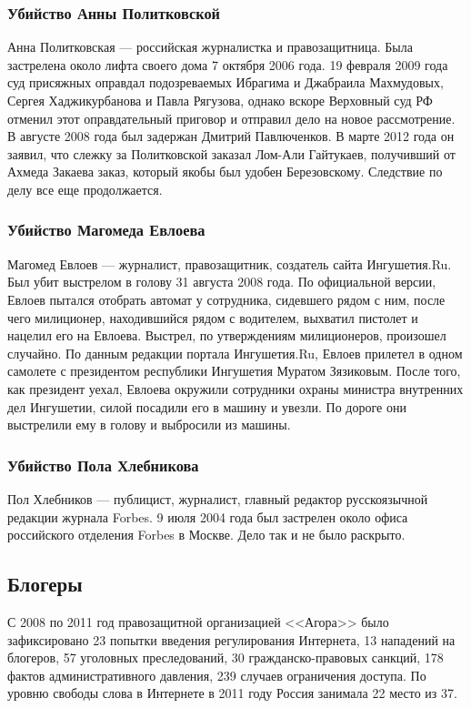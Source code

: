\subsubsection{Убийство Анны Политковской}
Анна Политковская --- российская журналистка и правозащитница. Была застрелена около лифта своего дома 7 октября 2006 года\cite{politkovskaya_death}. 19 февраля 2009 года суд присяжных оправдал подозреваемых Ибрагима и Джабраила Махмудовых, Сергея Хаджикурбанова и Павла Рягузова\cite{politkovskaya_court1}, однако вскоре Верховный суд РФ отменил этот оправдательный приговор и отправил дело на новое рассмотрение\cite{politkovskaya_court2,politkovskaya_court3}. В августе 2008 года был задержан Дмитрий Павлюченков\cite{politkovskaya_pavluchenkov}. В марте 2012 года он заявил, что слежку за Политковской заказал Лом-Али Гайтукаев, получивший от Ахмеда Закаева заказ, который якобы был удобен Березовскому\cite{politkovskaya_head}. Следствие по делу все еще продолжается.
\subsubsection{Убийство Магомеда Евлоева}
Магомед Евлоев --- журналист, правозащитник, создатель сайта Ингушетия.Ru. Был убит выстрелом в голову 31 августа 2008 года. По официальной версии, Евлоев пытался отобрать автомат у сотрудника, сидевшего рядом с ним, после чего милиционер, находившийся рядом с водителем, выхватил пистолет и нацелил его на Евлоева. Выстрел, по утверждениям милиционеров, произошел случайно\cite{evloev_mvd}. По данным редакции портала Ингушетия.Ru, Евлоев прилетел в одном самолете с президентом республики Ингушетия Муратом Зязиковым. После того, как президент уехал, Евлоева окружили сотрудники охраны министра внутренних дел Ингушетии, силой посадили его в машину и увезли. По дороге они выстрелили ему в голову и выбросили из машины\cite{evloev_death}.
\subsubsection{Убийство Пола Хлебникова}
Пол Хлебников --- публицист, журналист, главный редактор русскоязычной редакции журнала Forbes. 9 июля 2004 года был застрелен около офиса российского отделения Forbes в Москве\cite{hlebnikov_death}. Дело так и не было раскрыто.
\subsection{Блогеры}
С 2008 по 2011 год правозащитной организацией <<Агора>> было зафиксировано 23 попытки введения регулирования Интернета, 13 нападений на блогеров, 57 уголовных преследований, 30 гражданско-правовых санкций, 178 фактов административного давления, 239 случаев ограничения доступа\cite{agoranet,agoranet2011}. По уровню свободы слова в Интернете в 2011 году Россия занимала 22 место из 37\cite{netfreedom}.
